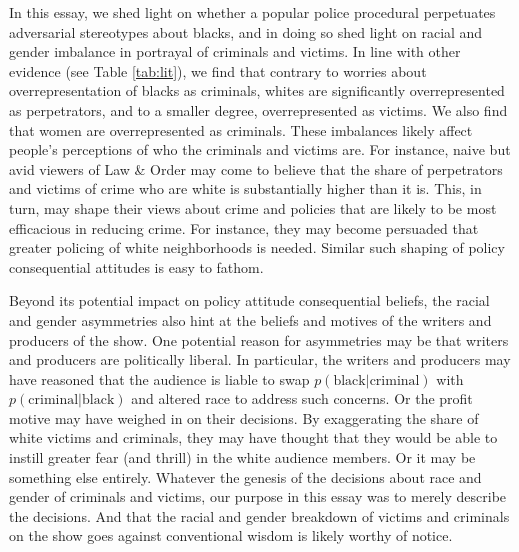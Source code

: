 \documentclass[12pt, letterpaper]{article}
\begin{document}
In this essay, we shed light on whether a popular police procedural perpetuates adversarial stereotypes about blacks, and in doing so shed light on racial and gender imbalance in portrayal of criminals and victims. In line with other evidence (see Table \ref{tab:lit}), we find that contrary to worries about overrepresentation of blacks as criminals, whites are significantly overrepresented as perpetrators, and to a smaller degree, overrepresented as victims. We also find that women are overrepresented as criminals. These imbalances likely affect people's perceptions of who the criminals and victims are. For instance, naive but avid viewers of Law \& Order may come to believe that the share of perpetrators and victims of crime who are white is substantially higher than it is. This, in turn, may shape their views about crime and policies that are likely to be most efficacious in reducing crime. For instance, they may become persuaded that greater policing of white neighborhoods is needed. Similar such shaping of policy consequential attitudes is easy to fathom. 

Beyond its potential impact on policy attitude consequential beliefs, the racial and gender asymmetries also hint at the beliefs and motives of the writers and producers of the show. One potential reason for asymmetries may be that writers and producers are politically liberal. In particular, the writers and producers may have reasoned that the audience is liable to swap $p(\text{black}|\text{criminal})$ with $p(\text{criminal}|\text{black})$ \citep[see, for instance,][]{bordalo2016stereotypes, ahler2016parties} and altered race to address such concerns. Or the profit motive may have weighed in on their decisions. By exaggerating the share of white victims and criminals, they may have thought that they would be able to instill greater fear (and thrill) in the white audience members. Or it may be something else entirely. Whatever the genesis of the decisions about race and gender of criminals and victims, our purpose in this essay was to merely describe the decisions. And that the racial and gender breakdown of victims and criminals on the show goes against conventional wisdom is likely worthy of notice. 

\clearpage




\clearpage
\appendix
\renewcommand{\thesection}{SI \arabic{section}}
\renewcommand\thetable{\thesection.\arabic{table}}  
\renewcommand\thefigure{\thesection.\arabic{figure}}
\end{document}
